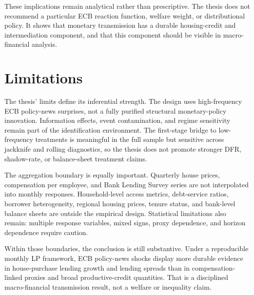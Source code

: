These implications remain analytical rather than prescriptive. The thesis does not recommend a particular ECB reaction function, welfare weight, or distributional policy. It shows that monetary transmission has a durable housing-credit and intermediation component, and that this component should be visible in macro-financial analysis.

\section{Limitations}

The thesis' limits define its inferential strength. The design uses high-frequency ECB policy-news surprises, not a fully purified structural monetary-policy innovation. Information effects, event contamination, and regime sensitivity remain part of the identification environment. The first-stage bridge to low-frequency treatments is meaningful in the full sample but sensitive across jackknife and rolling diagnostics, so the thesis does not promote stronger DFR, shadow-rate, or balance-sheet treatment claims.

The aggregation boundary is equally important. Quarterly house prices, compensation per employee, and Bank Lending Survey series are not interpolated into monthly responses. Household-level access metrics, debt-service ratios, borrower heterogeneity, regional housing prices, tenure status, and bank-level balance sheets are outside the empirical design. Statistical limitations also remain: multiple response variables, mixed signs, proxy dependence, and horizon dependence require caution.

Within those boundaries, the conclusion is still substantive. Under a reproducible monthly LP framework, ECB policy-news shocks display more durable evidence in house-purchase lending growth and lending spreads than in compensation-linked proxies and broad productive-credit quantities. That is a disciplined macro-financial transmission result, not a welfare or inequality claim.

